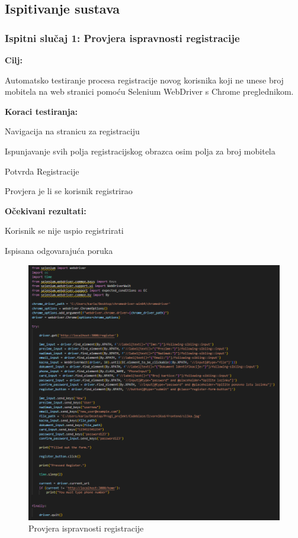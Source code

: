                        



			\subsection{Ispitivanje sustava}



			\subsubsection{Ispitni slučaj 1: Provjera ispravnosti registracije}
			
			\noindent\textbf{Cilj:}
			\begin{packed_item}
				Automatsko testiranje procesa registracije novog korisnika koji ne unese broj mobitela na web stranici pomoću Selenium WebDriver s Chrome preglednikom.
			\end{packed_item}
			
			\noindent\textbf{Koraci testiranja:}
			\begin{packed_item}
				\item Navigacija na stranicu za registraciju
				\item Ispunjavanje svih polja registracijskog obrazca osim polja za broj mobitela
				\item  Potvrda Registracije
				\item  Provjera je li se korisnik registrirao
				
			\end{packed_item}
			\noindent\textbf{Očekivani rezultati:}
			\begin{packed_item}
				\item  Korisnik se nije uspio registrirati
				\item Ispisana odgovarajuća poruka
			\end{packed_item}


						\begin{figure} [H]
							\centering
							\includegraphics[width=0.7\linewidth]{slike/RegisterSelenium.png}
							\caption{Provjera ispravnosti registracije}
							\label{fig:Provjera ispravnosti registracije}
						\end{figure}
						
